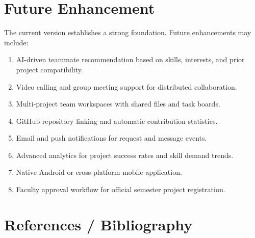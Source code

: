 \documentclass[12pt,a4paper,oneside]{report}
\begin{document}
\chapter{Future Enhancement}
The current version establishes a strong foundation. Future enhancements may include:
\begin{enumerate}[label=\arabic*.]
  \item AI-driven teammate recommendation based on skills, interests, and prior project compatibility.
  \item Video calling and group meeting support for distributed collaboration.
  \item Multi-project team workspaces with shared files and task boards.
  \item GitHub repository linking and automatic contribution statistics.
  \item Email and push notifications for request and message events.
  \item Advanced analytics for project success rates and skill demand trends.
  \item Native Android or cross-platform mobile application.
  \item Faculty approval workflow for official semester project registration.
\end{enumerate}

\clearpage

\setcounter{page}{26}
\chapter{References / Bibliography}
\end{document}
